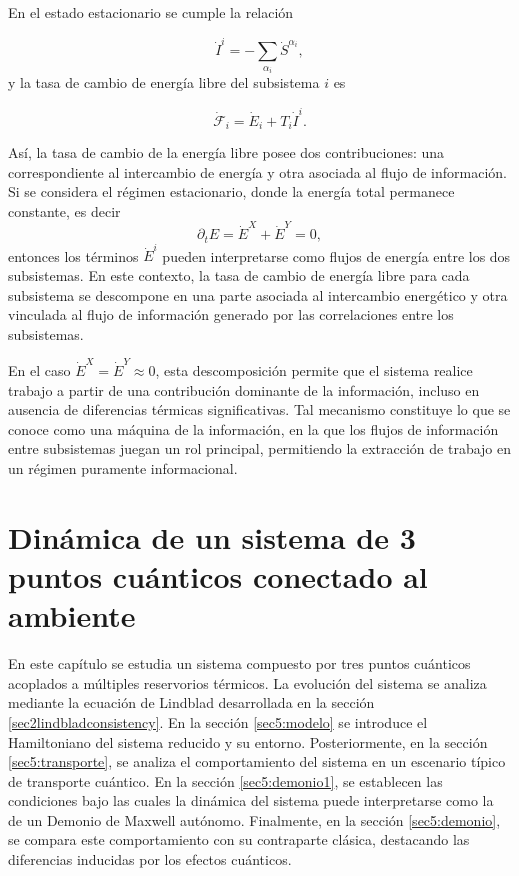 En el estado estacionario se cumple la relación

\begin{equation*}
    \dot{I}^{i} = - \sum_{\alpha_{i}}\dot{S}^{\alpha_{i}},
\end{equation*}
y la tasa de cambio de energía libre del subsistema $i$ es 

\begin{equation*}
    \dot{\mathcal{F}}_{i} = \dot{E}_{i} + T_{i} \dot{I}^{i}.
\end{equation*}

Así, la tasa de cambio de la energía libre posee dos contribuciones: una correspondiente al intercambio de energía y otra asociada al flujo de información. Si se considera el régimen estacionario, donde la energía total permanece constante, es decir
\begin{equation*}
    \partial_{t}E = \dot{E}^{X} + \dot{E}^{Y} = 0,
\end{equation*}
entonces los términos $\dot{E}^{i}$ pueden interpretarse como flujos de energía entre los dos subsistemas. En este contexto, la tasa de cambio de energía libre para cada subsistema se descompone en una parte asociada al intercambio energético y otra vinculada al flujo de información generado por las correlaciones entre los subsistemas.

En el caso $\dot{E}^{X} = \dot{E}^{Y} \approx 0 $, esta descomposición permite que el sistema realice trabajo a partir de una contribución dominante de la información, incluso en ausencia de diferencias térmicas significativas. Tal mecanismo constituye lo que se conoce como una máquina de la información, en la que los flujos de información entre subsistemas juegan un rol principal, permitiendo la extracción de trabajo en un régimen puramente informacional.


\label{sec4:flujos0}

\chapter{Dinámica de un sistema de 3 puntos cuánticos conectado al ambiente}
En este capítulo se estudia un sistema compuesto por tres puntos cuánticos acoplados a múltiples reservorios térmicos. La evolución del sistema se analiza mediante la ecuación de Lindblad desarrollada en la sección \ref{sec2lindbladconsistency}. En la sección \ref{sec5:modelo} se introduce el Hamiltoniano del sistema reducido y su entorno. Posteriormente, en la sección \ref{sec5:transporte}, se analiza el comportamiento del sistema en un escenario típico de transporte cuántico. En la sección \ref{sec5:demonio1}, se establecen las condiciones bajo las cuales la dinámica del sistema puede interpretarse como la de un Demonio de Maxwell autónomo. Finalmente, en la sección \ref{sec5:demonio}, se compara este comportamiento con su contraparte clásica, destacando las diferencias inducidas por los efectos cuánticos.

